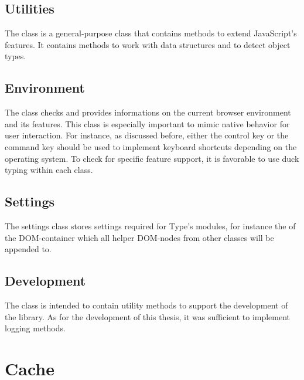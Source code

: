 \subsection{Utilities}
\label{sec:utilities_class}
The  class is a general-purpose class that contains methods to extend JavaScript's features. It contains methods to work with data structures and to detect object types.

\subsection{Environment}

The  class checks and provides informations on the current browser environment and its features. This class is especially important to mimic native behavior for user interaction. For instance, as discussed before, either the control key or the command key should be used to implement keyboard shortcuts depending on the operating system. To check for specific feature support, it is favorable to use duck typing within each class.

\subsection{Settings}

The settings class stores settings required for Type's modules, for instance the  of the DOM-container which all helper DOM-nodes from other classes will be appended to.

\subsection{Development}

The  class is intended to contain utility methods to support the development of the library. As for the development of this thesis, it was sufficient to implement logging methods.


\section{Cache}
\label{sec:cache}

